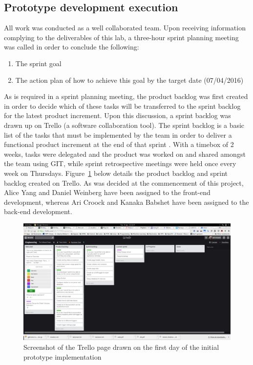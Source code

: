 \documentclass[11pt, a4paper]{article}
\begin{document}
	\subsection{Prototype development execution}
	All work was conducted as a well collaborated team. Upon receiving information complying to the deliverables of this lab, a three-hour sprint planning meeting was called in order to conclude the following: 
	\begin{enumerate}
		\item The sprint goal
		\item The action plan of how to achieve this goal by the target date (07/04/2016)
	\end{enumerate}
	\noindent
	As is required in a sprint planning meeting, the product backlog was first created in order to decide which of these tasks will be transferred to the sprint backlog for the latest product increment. 
	Upon this discussion, a sprint backlog was drawn up on Trello (a software collaboration tool). The sprint backlog is a basic list of the tasks that must be implemented by the team in order to deliver a functional product increment at the end of that sprint \cite{sprintbacklogdef}. 
	\newline
	\newline
	\noindent
	With a timebox of 2 weeks, tasks were delegated and the product was worked on and shared amongst the team using GIT, while sprint retrospective meetings were held once every week on Thursdays. Figure~\ref{fig:init_backlogs} below details the product backlog and sprint backlog created on Trello.
	\newline
	\newline
	\noindent	
	As was decided at the commencement of this project, Alice Yang and Daniel Weinberg have been assigned to the front-end development, whereas Ari Croock and Kanaka Babshet have been assigned to the back-end development. 
	\newline
	
	\begin{figure}[htb]
		\centering
		\includegraphics[width=\linewidth]{init_backlogs}
		\caption{Screenshot of the Trello page drawn on the first day of the initial prototype implementation}
		\label{fig:init_backlogs}
	\end{figure}
\end{document}
